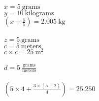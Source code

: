 \documentclass{article}
\begin{document}
$x = 5\ \mathrm{\mathrm{grams}}$\\
$y = 10\ \mathrm{\mathrm{kilograms}}$\\
$(x + \frac{y}{5}) = 2.005 \ \mathrm{k g\,}$\\
\\$z = 5\ \mathrm{\mathrm{grams}}$\\
$c = 5\ \mathrm{\mathrm{meters}}$\\
$c \times c = 25 \ \mathrm{ m^{2}\,}$\\
\\$d = 5\ \mathrm{\mathrm{\frac{\mathrm{grams}}{\mathrm{meters}}}}$\\
\\$(5 \times 4 + \frac{3 \times (5 + 2)}{4}) = 25.250$\\
\end{document}

